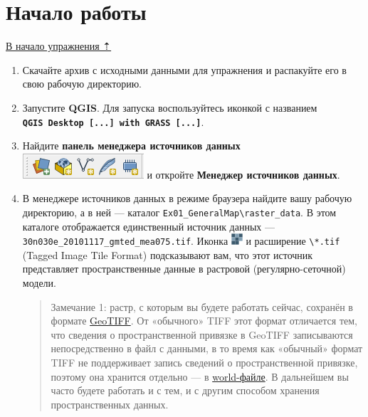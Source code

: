 \documentclass[
  12pt,
]{book}
\begin{document}
\hypertarget{map-design-general-begin}{%
\section{Начало работы}\label{map-design-general-begin}}

\protect\hyperlink{map-design-general}{В начало упражнения ⇡}

\begin{enumerate}
\def\labelenumi{\arabic{enumi}.}
\item
  Скачайте архив с исходными данными для упражнения и распакуйте его в свою рабочую директорию.
\item
  Запустите \textbf{QGIS}. Для запуска воспользуйтесь иконкой с названием \textbf{\texttt{QGIS\ Desktop\ {[}...{]}\ with\ GRASS\ {[}...{]}}}.
\item
  Найдите \textbf{панель менеджера источников данных} \includegraphics{images/Ex01/pic01.png} и откройте \textbf{Менеджер источников данных}.
\item
  В менеджере источников данных в режиме браузера найдите вашу рабочую директорию, а в ней --- каталог \texttt{Ex01\_GeneralMap\textbackslash{}raster\_data}. В этом каталоге отображается единственный источник данных --- \texttt{30n030e\_20101117\_gmted\_mea075.tif}. Иконка \includegraphics{images/Ex01/raster.png} и расширение \texttt{\textbackslash{}*.tif} (Tagged Image Tile Format) подсказывают вам, что этот источник представляет пространственные данные в растровой (регулярно-сеточной) модели.

  \begin{quote}
  Замечание 1: растр, с которым вы будете работать сейчас, сохранён в формате \href{https://www.opengeospatial.org/standards/geotiff}{GeoTIFF}. От «обычного» TIFF этот формат отличается тем, что сведения о пространственной привязке в GeoTIFF записываются непосредственно в файл с данными, в то время как «обычный» формат TIFF не поддерживает запись сведений о пространственной привязке, поэтому она хранится отдельно --- в \href{https://en.wikipedia.org/wiki/World_file}{world-файле}. В дальнейшем вы часто будете работать и с тем, и с другим способом хранения пространственных данных.
  \end{quote}


\end{enumerate}
\end{document}
